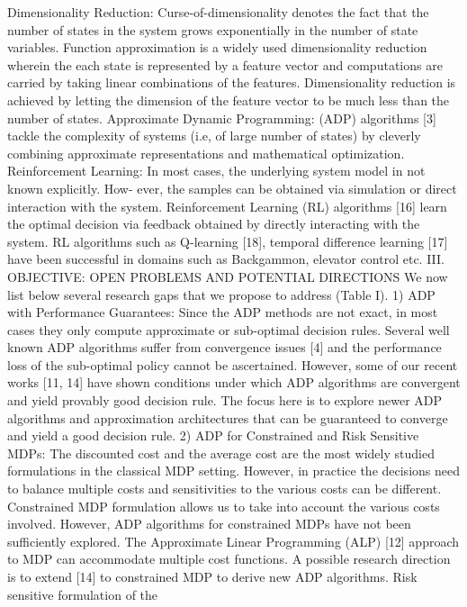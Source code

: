 Dimensionality Reduction: Curse-of-dimensionality denotes the fact that the number of states in the system grows exponentially in the number of state variables. Function approximation is a widely used dimensionality reduction wherein the each state is represented by a feature vector and computations are carried by taking linear combinations of the features. Dimensionality reduction is achieved by letting the dimension of the feature vector to be much less than the number of states.
Approximate Dynamic Programming: (ADP) algorithms [3] tackle the complexity of systems (i.e, of large number of states) by cleverly combining approximate representations and mathematical optimization. Reinforcement Learning: In most cases, the underlying system model in not known explicitly. How- ever, the samples can be obtained via simulation or direct interaction with the system. Reinforcement Learning (RL) algorithms [16] learn the optimal decision via feedback obtained by directly interacting with the system. RL algorithms such as Q-learning [18], temporal difference learning [17] have been
successful in domains such as Backgammon, elevator control etc.
III. OBJECTIVE: OPEN PROBLEMS AND POTENTIAL DIRECTIONS We now list below several research gaps that we propose to address (Table I).
1) ADP with Performance Guarantees: Since the ADP methods are not exact, in most cases they only compute approximate or sub-optimal decision rules. Several well known ADP algorithms suffer from convergence issues [4] and the performance loss of the sub-optimal policy cannot be ascertained. However, some of our recent works [11, 14] have shown conditions under which ADP algorithms are convergent and yield provably good decision rule. The focus here is to explore newer ADP algorithms and approximation architectures that can be guaranteed to converge and yield a good decision rule.
2) ADP for Constrained and Risk Sensitive MDPs: The discounted cost and the average cost are the most widely studied formulations in the classical MDP setting. However, in practice the decisions need to balance multiple costs and sensitivities to the various costs can be different. Constrained MDP formulation allows us to take into account the various costs involved. However, ADP algorithms for constrained MDPs have not been sufficiently explored. The Approximate Linear Programming (ALP) [12] approach to MDP can accommodate multiple cost functions. A possible research direction is to extend [14] to constrained MDP to derive new ADP algorithms. Risk sensitive formulation of the